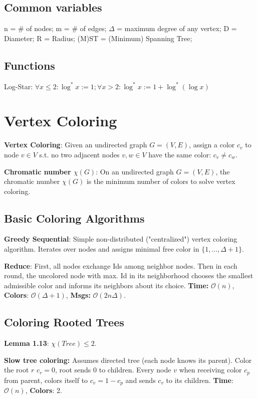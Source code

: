 \documentclass[a4paper, 8pt, landscape]{scrartcl}
\begin{document}
\begin{multicols*}{3}
\subsection*{Common variables}
n = \# of nodes; m = \# of edges; $\Delta$ = maximum degree of any vertex; D = Diameter; R = Radius; (M)ST = (Minimum) Spanning Tree;

\subsection*{Functions}

Log-Star: $\forall x \leq 2: \log^*x := 1; \forall x > 2: \log^*x := 1 + \log^*(\log x)$


\section{Vertex Coloring}

\textbf{Vertex Coloring}: Given an undirected graph $G=(V,E)$, assign a color $c_v$ to node $v \in V$ s.t. no two adjacent nodes $v,w \in V$ have the same color: $c_v \neq c_w$.

\textbf{Chromatic number $\chi(G)$}: On an undirected graph $G=(V,E)$, the chromatic number $\chi(G)$ is the minimum number of colors to solve vertex coloring.

\subsection{Basic Coloring Algorithms}

\textbf{Greedy Sequential}: Simple non-distributed ("centralized") vertex coloring algorithm. Iterates over nodes and assigns minimal free color in $\{1,...,\Delta+1\}$.

\columnbreak

\textbf{Reduce}: First, all nodes exchange Ids among neighbor nodes. Then in each round, the uncolored node with max. Id in its neighborhood chooses the smallest admissible color and informs its neighbors about its choice. \textbf{Time:} $\mathcal{O}(n)$, \textbf{Colors}: $\mathcal{O}(\Delta+1)$, \textbf{Msgs:} $\mathcal{O}(2n\Delta)$.

\subsection{Coloring Rooted Trees}

\textbf{Lemma 1.13}: $\chi(Tree) \leq 2$.

\textbf{Slow tree coloring:} Assumes directed tree (each node knows its parent). Color the root $r$ $c_r = 0$, root sends 0 to children. Every node $v$ when receiving color $c_p$ from parent, colors itself to $c_v = 1 - c_p$ and sends $c_v$ to its children. \textbf{Time}: $\mathcal{O}(n)$, \textbf{Colors}: 2.


\end{multicols*}
\end{document}

